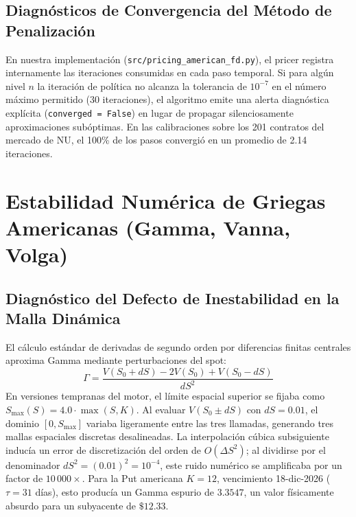 \documentclass[11pt,a4paper]{article}
\begin{document}
\subsection{Diagnósticos de Convergencia del Método de Penalización}
En nuestra implementación (\texttt{src/pricing\_american\_fd.py}), el pricer registra internamente las iteraciones consumidas en cada paso temporal. Si para algún nivel $n$ la iteración de política no alcanza la tolerancia de $10^{-7}$ en el número máximo permitido (30 iteraciones), el algoritmo emite una alerta diagnóstica explícita (\texttt{converged = False}) en lugar de propagar silenciosamente aproximaciones subóptimas. En las calibraciones sobre los 201 contratos del mercado de NU, el 100\% de los pasos convergió en un promedio de 2.14 iteraciones.

\newpage
\section{Estabilidad Numérica de Griegas Americanas (Gamma, Vanna, Volga)}

\subsection{Diagnóstico del Defecto de Inestabilidad en la Malla Dinámica}
El cálculo estándar de derivadas de segundo orden por diferencias finitas centrales aproxima Gamma mediante perturbaciones del spot:
\begin{equation}
    \Gamma = \frac{V(S_0 + dS) - 2V(S_0) + V(S_0 - dS)}{dS^2}
\end{equation}
En versiones tempranas del motor, el límite espacial superior se fijaba como $S_{\max}(S) = 4.0 \cdot \max(S, K)$. Al evaluar $V(S_0 \pm dS)$ con $dS = 0.01$, el dominio $[0, S_{\max}]$ variaba ligeramente entre las tres llamadas, generando tres mallas espaciales discretas desalineadas. La interpolación cúbica subsiguiente inducía un error de discretización del orden de $O(\Delta S^2)$; al dividirse por el denominador $dS^2 = (0.01)^2 = 10^{-4}$, este ruido numérico se amplificaba por un factor de $10\,000\times$. Para la Put americana $K=12$, vencimiento 18-dic-2026 ($\tau = 31$ días), esto producía un Gamma espurio de $3.3547$, un valor físicamente absurdo para un subyacente de $\$12.33$.
\end{document}
